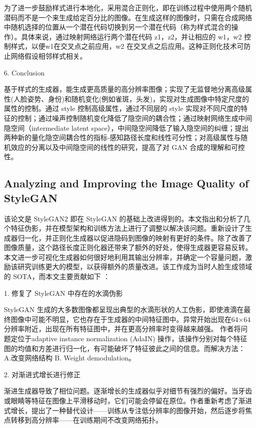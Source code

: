 为了进一步鼓励样式进行本地化，采用混合正则化，即在训练过程中使用两个随机潜码而不是一个来生成给定百分比的图像。在生成这样的图像时，只需在合成网络中随机选择的位置从一个潜在代码切换到另一个潜在代码（称为样式混合的操作）。具体来说，通过映射网络运行两个潜在代码 z1，z2，并让相应的 w1，w2 控制样式，以便w1在交叉点之前应用，w2 在交叉点之后应用。这种正则化技术可防止网络假设相邻样式相关。

6. Conclusion

基于样式的生成器，能生成更高质量的高分辨率图像；实现了无监督地分离高级属性(人脸姿势、身份)和随机变化(例如雀斑，头发)，实现对生成图像中特定尺度的属性的控制。通过 style 控制高级属性，通过不同层的 style 实现对不同尺度的特征的控制；通过噪声控制随机变化降低了隐空间的耦合性；通过映射网络生成中间隐空间（intermediate latent space），中间隐空间降低了输入隐空间的纠缠；提出两种新的量化隐空间耦合性的指标-感知路径长度和线性可分性；对高级属性与随机效应的分离以及中间隐空间的线性的研究，提高了对 GAN 合成的理解和可控性。

\subsection{Analyzing and Improving the Image Quality of StyleGAN}

该论文是 StyleGAN2 即在 StyleGAN 的基础上改进得到的。本文指出和分析了几个特征伪影，并在模型架构和训练方法上进行了调整以解决该问题。重新设计了生成器归一化，并正则化生成器以促进隐码到图像的映射有更好的条件。除了改善了图像质量，这个路径长度正则化器还带来了额外的好处，使得生成器更容易反转。本文进一步可视化生成器如何很好地利用其输出分辨率，并确定一个容量问题，激励该研究训练更大的模型，以获得额外的质量改进。该工作成为当时人脸生成领域的 SOTA，而本文主要贡献如下 ：

1. 修复了 StyleGAN 中存在的水滴伪影

StyleGAN 生成的大多数图像都呈现出典型的水滴形状的人工伪影，即使液滴在最终图像中可能不明显，它也存在于生成器的中间特征图中。异常开始出现在64×64分辨率附近，出现在所有特征图中，并在更高分辨率时变得越来越强。
作者将问题定位于adaptive instance normalization (AdaIN) 操作，该操作分别对每个特征图的均值和方差进行归一化，有可能破坏了特征彼此之间的信息。而解决方法：A.改变网络结构  B. Weight demodulation。

2. 对渐进式增长进行修正

渐进生成器导致了相位问题。逐渐增长的生成器似乎对细节有强烈的偏好。当牙齿或眼睛等特征在图像上平滑移动时，它们可能会停留在原位。作者重新考虑了渐进式增长，提出了一种替代设计——训练从专注低分辨率的图像开始，然后逐步将焦点转移到高分辨率——在训练期间不改变网络拓扑。

